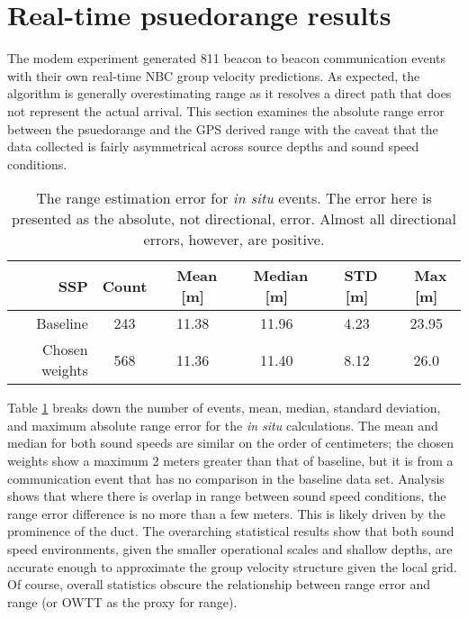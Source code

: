 \FloatBarrier
\section{\label{sec:4} Real-time psuedorange results}

The modem experiment generated 811 beacon to beacon communication events with their own real-time NBC group velocity predictions.
As expected, the algorithm is generally overestimating range as it resolves a direct path that does not represent the actual arrival.
This section examines the absolute range error between the psuedorange and the GPS derived range with the caveat that the data collected is fairly asymmetrical across source depths and sound speed conditions.

\begin{table}[h!]
\renewcommand{\arraystretch}{1.3}
\centering
\begin{tabular}{r|c|c|c|c|c}
SSP & Count & ~Mean [m] & ~Median [m] & ~STD [m] & ~Max [m] \\ \hline
Baseline & 243 & 11.38 & 11.96 & 4.23 & 23.95 \\ 
Chosen weights & 568 & 11.36 & 11.40 & 8.12 & 26.0 \\
\toprule
\end{tabular}
\caption[Range estimation error for \textit{in situ} events]{The range estimation error for \textit{in situ} events. The error here is presented as the absolute, not directional, error. Almost all directional errors, however, are positive.}
\label{tab:rangeErrorInSitu}
\end{table}

Table \ref{tab:rangeErrorInSitu} breaks down the number of events, mean, median, standard deviation, and maximum absolute range error for the \textit{in situ} calculations.
The mean and median for both sound speeds are similar on the order of centimeters; the chosen weights show a maximum 2 meters greater than that of baseline, but it is from a communication event that has no comparison in the baseline data set.
Analysis shows that where there is overlap in range between sound speed conditions, the range error difference is no more than a few meters.
This is likely driven by the prominence of the duct.
The overarching statistical results show that both sound speed environments, given the smaller operational scales and shallow depths, are accurate enough to approximate the group velocity structure given the local grid.
Of course, overall statistics obscure the relationship between range error and range (or OWTT as the proxy for range).

